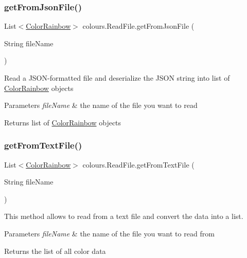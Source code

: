 \subsubsection{\texorpdfstring{get\+From\+Json\+File()}{getFromJsonFile()}}
{\footnotesize\ttfamily List$<$\hyperlink{classcolours_1_1_color_rainbow}{Color\+Rainbow}$>$ colours.\+Read\+File.\+get\+From\+Json\+File (\begin{DoxyParamCaption}\item[{String}]{file\+Name }\end{DoxyParamCaption})\hspace{0.3cm}{\ttfamily [inline]}}

Read a J\+S\+O\+N-\/formatted file and deserialize the J\+S\+ON string into list of \hyperlink{classcolours_1_1_color_rainbow}{Color\+Rainbow} objects 
\begin{DoxyParams}{Parameters}
{\em file\+Name} & the name of the file you want to read \\
\hline
\end{DoxyParams}
\begin{DoxyReturn}{Returns}
list of \hyperlink{classcolours_1_1_color_rainbow}{Color\+Rainbow} objects 
\end{DoxyReturn}
\mbox{\label{classcolours_1_1_read_file_a6b240cdce8df090dca527f367bacb95b}} 
\subsubsection{\texorpdfstring{get\+From\+Text\+File()}{getFromTextFile()}}
{\footnotesize\ttfamily List$<$\hyperlink{classcolours_1_1_color_rainbow}{Color\+Rainbow}$>$ colours.\+Read\+File.\+get\+From\+Text\+File (\begin{DoxyParamCaption}\item[{String}]{file\+Name }\end{DoxyParamCaption})\hspace{0.3cm}{\ttfamily [inline]}}

This method allows to read from a text file and convert the data into a list. 
\begin{DoxyParams}{Parameters}
{\em file\+Name} & the name of the file you want to read from \\
\hline
\end{DoxyParams}
\begin{DoxyReturn}{Returns}
the list of all color data 
\end{DoxyReturn}


